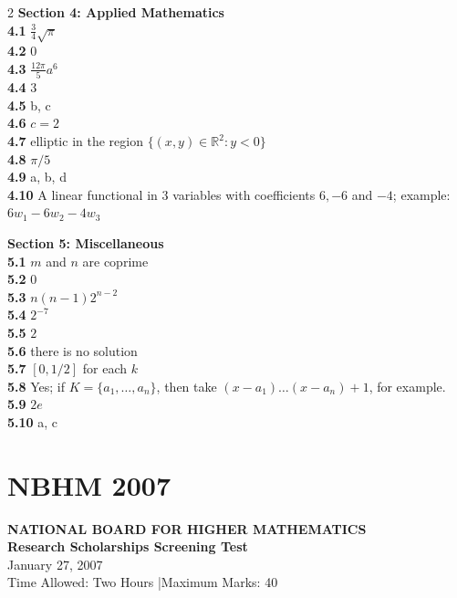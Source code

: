 \documentclass[11pt,a4paper]{article}
\newcommand{\R}{\mathbb{R}}
\newcommand{\examheader}[4]{%
  \clearpage
  \section{#1}
  \begin{center}
    {\large\bfseries NATIONAL BOARD FOR HIGHER MATHEMATICS}\\[3pt]
    {\bfseries #2}\\[2pt]
    {#3}\\[2pt]
    {\small #4}
  \end{center}
  \vspace{4pt}
}
\begin{document}
\begin{multicols}{2}
\medskip
\textbf{Section 4: Applied Mathematics}\\
\textbf{4.1} $\frac{3}{4}\sqrt{\pi}$\\
\textbf{4.2} $0$\\
\textbf{4.3} $\frac{12\pi}{5}a^6$\\
\textbf{4.4} $3$\\
\textbf{4.5} b, c\\
\textbf{4.6} $c = 2$\\
\textbf{4.7} elliptic in the region $\{(x, y) \in \R^2 : y < 0\}$\\
\textbf{4.8} $\pi/5$\\
\textbf{4.9} a, b, d\\
\textbf{4.10} A linear functional in $3$ variables with coefficients $6, -6$ and $-4$; example: $6w_1 - 6w_2 - 4w_3$

\medskip
\textbf{Section 5: Miscellaneous}\\
\textbf{5.1} $m$ and $n$ are coprime\\
\textbf{5.2} $0$\\
\textbf{5.3} $n(n-1)2^{n-2}$\\
\textbf{5.4} $2^{-7}$\\
\textbf{5.5} $2$\\
\textbf{5.6} there is no solution\\
\textbf{5.7} $[0, 1/2]$ for each $k$\\
\textbf{5.8} Yes; if $K = \{a_1, \dots, a_n\}$, then take $(x - a_1)\dots(x - a_n) + 1$, for example.\\
\textbf{5.9} $2e$\\
\textbf{5.10} a, c
\end{multicols}
\examheader{NBHM 2007}{Research Scholarships Screening Test}{January 27, 2007}{Time Allowed: Two Hours \quad|\quad Maximum Marks: 40}
\end{document}
